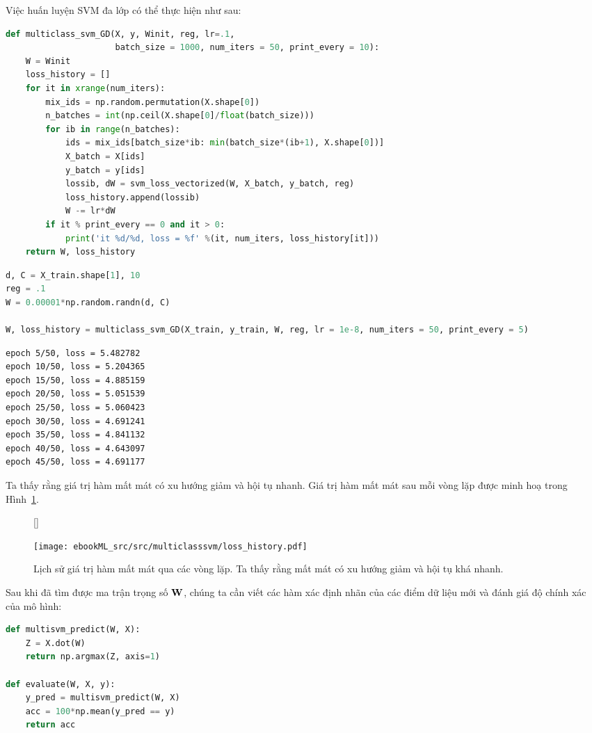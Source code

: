 Việc huấn luyện SVM đa lớp có thể thực hiện như sau:
\begin{lstlisting}[language=Python]
def multiclass_svm_GD(X, y, Winit, reg, lr=.1,
                      batch_size = 1000, num_iters = 50, print_every = 10):
    W = Winit
    loss_history = []
    for it in xrange(num_iters):
        mix_ids = np.random.permutation(X.shape[0])
        n_batches = int(np.ceil(X.shape[0]/float(batch_size)))
        for ib in range(n_batches):
            ids = mix_ids[batch_size*ib: min(batch_size*(ib+1), X.shape[0])]
            X_batch = X[ids]
            y_batch = y[ids]
            lossib, dW = svm_loss_vectorized(W, X_batch, y_batch, reg)
            loss_history.append(lossib)
            W -= lr*dW
        if it % print_every == 0 and it > 0:
            print('it %d/%d, loss = %f' %(it, num_iters, loss_history[it]))
    return W, loss_history
\end{lstlisting}
\begin{lstlisting}[language=Python]
d, C = X_train.shape[1], 10
reg = .1
W = 0.00001*np.random.randn(d, C)

W, loss_history = multiclass_svm_GD(X_train, y_train, W, reg, lr = 1e-8, num_iters = 50, print_every = 5)
\end{lstlisting}
\kq
\begin{lstlisting}
epoch 5/50, loss = 5.482782
epoch 10/50, loss = 5.204365
epoch 15/50, loss = 4.885159
epoch 20/50, loss = 5.051539
epoch 25/50, loss = 5.060423
epoch 30/50, loss = 4.691241
epoch 35/50, loss = 4.841132
epoch 40/50, loss = 4.643097
epoch 45/50, loss = 4.691177
\end{lstlisting}
Ta thấy rằng giá trị hàm mất mát có xu hướng giảm và hội tụ nhanh. Giá trị hàm mất mát sau mỗi vòng lặp được minh hoạ trong Hình~\ref{fig:22_8}.
\begin{figure}[t]

[\FBwidth]
{\caption{
Lịch sử giá trị hàm mất mát qua các vòng lặp. Ta thấy rằng mất mát có xu hướng giảm và hội tụ khá nhanh.
}
\label{fig:22_8}}
{ %
\texttt{[image: ebookML\_src/src/multiclasssvm/loss\_history.pdf]}
}
\end{figure}

Sau khi đã tìm được ma trận trọng số $\mathbf{W}$,
chúng ta cần viết các hàm xác định nhãn của các điểm dữ liệu mới và đánh giá độ chính xác của mô hình:
\begin{lstlisting}[language=Python]
def multisvm_predict(W, X):
    Z = X.dot(W)
    return np.argmax(Z, axis=1)

def evaluate(W, X, y):
    y_pred = multisvm_predict(W, X)
    acc = 100*np.mean(y_pred == y)
    return acc
\end{lstlisting}

